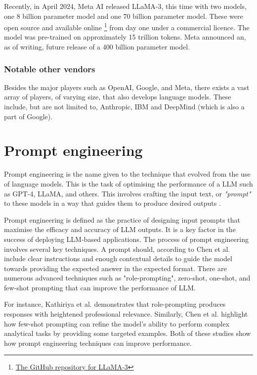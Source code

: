 Recently, in April 2024, Meta AI released LLaMA-3, this time with two models, one 8 billion parameter model and one 70 billion parameter model. These were open source and available online \footnote{\href{https://github.com/meta-llama/llama3}{The GitHub repository for LLaMA-3}} from day one under a commercial licence. The model was pre-trained on approximately 15 trillion tokens. Meta announced an, as of writing, future release of a 400 billion parameter model.


\subsubsection{Notable other vendors}


Besides the major players such as OpenAI, Google, and Meta, there exists a vast array of players, of varying size, that also develops language models. These include, but are not limited to, Anthropic, IBM and DeepMind (which is also a part of Google).


\section{Prompt engineering}
\label{sec:prompt_engineering}


Prompt engineering is the name given to the technique that evolved from the use of language models. This is the task of optimising the performance of a \gls{LLM} such as GPT-4, LLaMA, and others. This involves crafting the input text, or \textit{"prompt"} to these models in a way that guides them to produce desired outputs \cite{kathiriya_power_2023, chen_unleashing_2023}.


Prompt engineering is defined as the practice of designing input prompts that maximise the efficacy and accuracy of LLM outputs. It is a key factor in the success of deploying LLM-based applications. The process of prompt engineering involves several key techniques. A prompt should, according to Chen et al. include clear instructions and enough contextual details to guide the model towards providing the expected answer in the expected format. There are numerous advanced techniques such as "role-prompting", zero-shot, one-shot, and few-shot prompting that can improve the performance of LLM.


For instance, Kathiriya et al. \cite{kathiriya_power_2023} demonstrates that role-prompting produces responses with heightened professional relevance. Similarly, Chen et al. highlight how few-shot prompting can refine the model's ability to perform complex analytical tasks by providing some targeted examples. Both of these studies show how prompt engineering techniques can improve performance.



